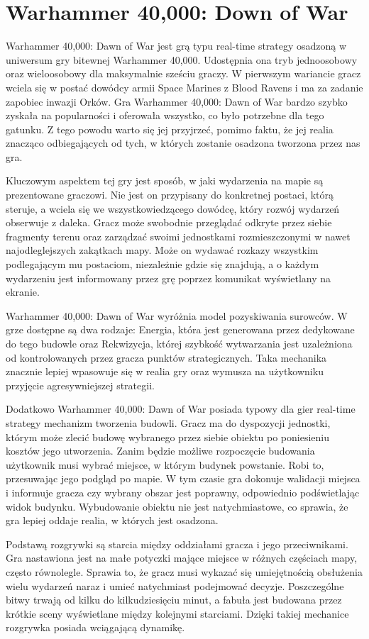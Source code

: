 \section{Warhammer 40,000: Down of War}

Warhammer 40,000: Dawn of War jest grą typu real-time strategy osadzoną w uniwersum gry bitewnej Warhammer 40,000. Udostępnia
ona tryb jednoosobowy oraz wieloosobowy dla maksymalnie sześciu graczy. W pierwszym wariancie gracz wciela się w postać dowódcy
armii Space Marines z Blood Ravens i ma za zadanie zapobiec inwazji Orków. Gra Warhammer 40,000: Dawn of War bardzo szybko
zyskała na popularności i oferowała wszystko, co było potrzebne dla tego gatunku. Z tego powodu warto się jej przyjrzeć,
pomimo faktu, że jej realia znacząco odbiegających od tych, w których zostanie osadzona tworzona przez nas gra.

Kluczowym aspektem tej gry jest sposób, w jaki wydarzenia na mapie są prezentowane graczowi. Nie jest on przypisany do
konkretnej postaci, którą steruje, a wciela się we wszystkowiedzącego dowódcę, który rozwój wydarzeń obserwuje z daleka.
Gracz może swobodnie przeglądać odkryte przez siebie fragmenty terenu oraz zarządzać swoimi jednostkami rozmieszczonymi
w nawet najodleglejszych zakątkach mapy. Może on wydawać rozkazy wszystkim podlegającym mu postaciom, niezależnie gdzie
się znajdują, a o każdym wydarzeniu jest informowany przez grę poprzez komunikat wyświetlany na ekranie.

Warhammer 40,000: Dawn of War wyróżnia model pozyskiwania surowców. W grze dostępne są dwa rodzaje: Energia, która jest
generowana przez dedykowane do tego budowle oraz Rekwizycja, której szybkość wytwarzania jest uzależniona od kontrolowanych
przez gracza punktów strategicznych. Taka mechanika znacznie lepiej wpasowuje się w realia gry oraz wymusza na użytkowniku
przyjęcie agresywniejszej strategii.

Dodatkowo Warhammer 40,000: Dawn of War posiada typowy dla gier real-time strategy mechanizm tworzenia budowli. Gracz ma
do dyspozycji jednostki, którym może zlecić budowę wybranego przez siebie obiektu po poniesieniu kosztów jego utworzenia.
Zanim będzie możliwe rozpoczęcie budowania użytkownik musi wybrać miejsce, w którym budynek powstanie. Robi to, przesuwając
jego podgląd po mapie. W tym czasie gra dokonuje walidacji miejsca i informuje gracza czy wybrany obszar jest poprawny,
odpowiednio podświetlając widok budynku. Wybudowanie obiektu nie jest natychmiastowe, co sprawia, że gra lepiej oddaje
realia, w których jest osadzona.

Podstawą rozgrywki są starcia między oddziałami gracza i jego przeciwnikami. Gra nastawiona jest na małe potyczki mające
miejsce w różnych częściach mapy, często równolegle. Sprawia to, że gracz musi wykazać się umiejętnością obsłużenia wielu
wydarzeń naraz i umieć natychmiast podejmować decyzje. Poszczególne bitwy trwają od kilku do kilkudziesięciu minut, a
fabuła jest budowana przez krótkie sceny wyświetlane między kolejnymi starciami. Dzięki takiej mechanice rozgrywka
posiada wciągającą dynamikę.

